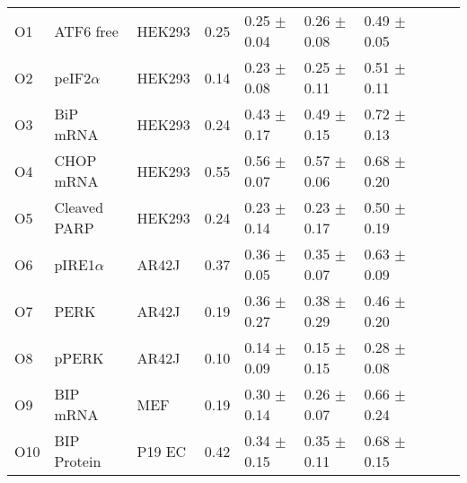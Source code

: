 \begin{center}
\tablelasttail{\hline}
\label{obj-table}
\begin{scriptsize}
\begin{supertabular}{l l l l l l l l l l}  
\hline
O1  & ATF6 free & HEK293 & 0.25 & 0.25 $\pm$ 0.04 & 0.26 $\pm$ 0.08 & 0.49 $\pm$ 0.05 & \cite{lin2007ire1} \\
O2  & peIF2$\alpha$ & HEK293 & 0.14 & 0.23 $\pm$ 0.08 & 0.25 $\pm$ 0.11 & 0.51 $\pm$ 0.11 & \cite{lin2007ire1} \\
O3  & BiP mRNA & HEK293 & 0.24 & 0.43 $\pm$ 0.17 & 0.49 $\pm$ 0.15 &  0.72 $\pm$ 0.13 & \cite{lin2007ire1} \\
O4  & CHOP mRNA & HEK293 & 0.55 & 0.56 $\pm$ 0.07 & 0.57 $\pm$ 0.06 & 0.68 $\pm$ 0.20 & \cite{lin2007ire1} \\
O5  & Cleaved PARP & HEK293 & 0.24 & 0.23 $\pm$ 0.14 & 0.23 $\pm$ 0.17 & 0.50 $\pm$ 0.19 & \cite{lin2009divergent} \\
O6  & pIRE1$\alpha$ & AR42J & 0.37 & 0.36 $\pm$ 0.05 & 0.35 $\pm$ 0.07 & 0.63 $\pm$ 0.09 & \cite{bertolotti2000dib} \\
O7  & PERK & AR42J & 0.19 & 0.36 $\pm$ 0.27 & 0.38 $\pm$ 0.29 & 0.46 $\pm$ 0.20  & \cite{bertolotti2000dib} \\
O8  & pPERK & AR42J & 0.10 & 0.14 $\pm$ 0.09 & 0.15 $\pm$ 0.15 & 0.28 $\pm$ 0.08  & \cite{bertolotti2000dib} \\
O9  & BIP mRNA & MEF & 0.19 & 0.30 $\pm$ 0.14 & 0.26 $\pm$ 0.07 & 0.66 $\pm$ 0.24 & \cite{yamamoto2004Differential} \\
O10  & BIP Protein & P19 EC & 0.42 & 0.34 $\pm$ 0.15 & 0.35 $\pm$ 0.11 & 0.68 $\pm$ 0.15 & \cite{jimbo2003er} \\

\end{supertabular}
\end{scriptsize}
\end{center}
